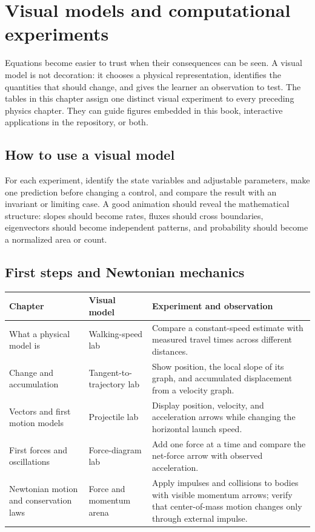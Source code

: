 \documentclass[11pt,oneside]{book}
\theoremstyle{reviewstyle}
\begin{document}
\chapter{Visual models and computational experiments}
Equations become easier to trust when their consequences can be seen. A visual model is not decoration: it chooses a physical representation, identifies the quantities that should change, and gives the learner an observation to test. The tables in this chapter assign one distinct visual experiment to every preceding physics chapter. They can guide figures embedded in this book, interactive applications in the repository, or both.

\section{How to use a visual model}
For each experiment, identify the state variables and adjustable parameters, make one prediction before changing a control, and compare the result with an invariant or limiting case. A good animation should reveal the mathematical structure: slopes should become rates, fluxes should cross boundaries, eigenvectors should become independent patterns, and probability should become a normalized area or count.

\section{First steps and Newtonian mechanics}
\begin{longtable}{p{}p{}p{}}
\toprule Chapter & Visual model & Experiment and observation\\ \midrule
\endhead
What a physical model is & Walking-speed lab & Compare a constant-speed estimate with measured travel times across different distances.\\
Change and accumulation & Tangent-to-trajectory lab & Show position, the local slope of its graph, and accumulated displacement from a velocity graph.\\
Vectors and first motion models & Projectile lab & Display position, velocity, and acceleration arrows while changing the horizontal launch speed.\\
First forces and oscillations & Force-diagram lab & Add one force at a time and compare the net-force arrow with observed acceleration.\\
Newtonian motion and conservation laws & Force and momentum arena & Apply impulses and collisions to bodies with visible momentum arrows; verify that center-of-mass motion changes only through external impulse.\\
\bottomrule
\end{longtable}
\end{document}
